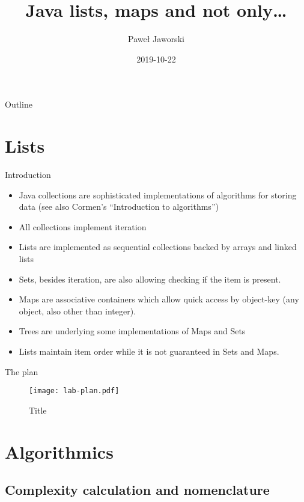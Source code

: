 \documentclass{beamer}
\title[Java lists, maps and not only]{Java lists, maps and not only\ldots}
\author{Paweł Jaworski}
\institute{Luxoft Poland Sp. z o.o.}
\date{2019-10-22}
\begin{document}
\begin{frame}
  \titlepage
\end{frame}

\begin{frame}{Outline}
  \tableofcontents
\end{frame}

\section{Lists}

\begin{frame}{Introduction}

\begin{itemize}
  \item Java collections are sophisticated implementations of algorithms for storing data (see also Cormen's ``Introduction to algorithms'')
  \item All collections implement iteration
  \item Lists are implemented as sequential collections backed by arrays and linked lists
  \item Sets, besides iteration, are also allowing checking if the item is present.
  \item Maps are associative containers which allow quick access by object-key (any object, also other than integer).
  \item Trees are underlying some implementations of Maps and Sets
  \item Lists maintain item order while it is not guaranteed in Sets and Maps.
\end{itemize}

\end{frame}

\begin{frame}{The plan}
    \begin{figure}[htbp]
    \centering
        \texttt{[image: lab-plan.pdf]}
    \caption{Title}
    \label{fig:lab-plan}
    \end{figure}

\end{frame}

\section{Algorithmics}

\subsection{Complexity calculation and nomenclature}
\end{document}
